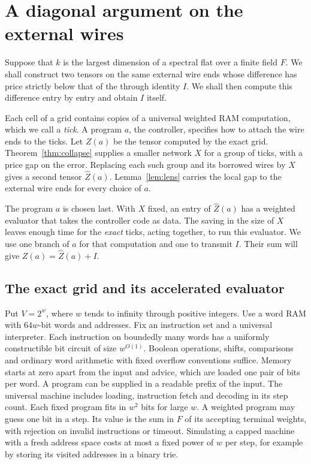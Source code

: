 \section{A diagonal argument on the external wires}\label{sec:diagonal}

Suppose that $k$ is the largest dimension of a spectral flat over a
finite field $F$. We shall construct two tensors on the same external wire
ends whose difference has price strictly below that of the through
identity $I$. We shall then compute this difference entry by entry and
obtain $I$ itself.

Each cell of a grid contains copies of a universal weighted RAM
computation, which we call a \emph{tick}. A program $a$, the controller,
specifies how to attach the wire ends to the ticks. Let $Z(a)$ be the
tensor computed by the exact grid. Theorem~\ref{thm:collapse} supplies
a smaller network $X$ for a group of ticks, with a price gap on the
error. Replacing each such group and its borrowed wires by $X$ gives a
second tensor $\widehat Z(a)$. Lemma~\ref{lem:lens} carries the local gap
to the external wire ends for every choice of $a$.

The program $a$ is chosen last. With $X$ fixed, an entry of
$\widehat Z(a)$ has a weighted evaluator that takes the controller code
as data. The saving in the size of $X$ leaves enough time for the
\emph{exact} ticks, acting together, to run this evaluator. We use one
branch of $a$ for that computation and one to transmit $I$. Their sum
will give $Z(a)=\widehat Z(a)+I$.

\subsection{The exact grid and its accelerated evaluator}

Put $V=2^w$, where $w$ tends to infinity through positive integers.
Use a word RAM with $64w$-bit words and addresses. Fix an instruction set and a universal interpreter. Each instruction on
boundedly many words has a uniformly constructible bit circuit of size
$w^{O(1)}$. Boolean operations, shifts, comparisons and ordinary word
arithmetic with fixed overflow conventions suffice. Memory starts at zero
apart from the input and advice, which are loaded one pair of bits per word.
A program can be supplied in a readable prefix of the input. The universal machine includes loading, instruction
fetch and decoding in its step count. Each fixed program fits in $w^2$
bits for large $w$. A weighted program may guess one bit in a step.
Its value is the sum in $F$ of its accepting terminal weights, with
rejection on invalid instructions or timeout. Simulating a capped machine
with a fresh address space costs at most a fixed power of $w$ per step,
for example by storing its visited addresses in a binary trie.

